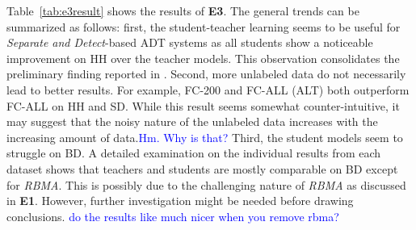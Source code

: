 \documentclass{article}
\newcommand{\comment}[1]{{\textcolor{blue}{#1}}}
\begin{document}
Table~\ref{tab:e3result} shows the results of \textbf{E3}. The general trends can be summarized as follows: first, the student-teacher learning seems to be useful for \textit{Separate and Detect}-based ADT systems as all students show a noticeable improvement on HH over the teacher models. This observation consolidates the preliminary finding reported in \cite{Wu2017}. Second, more unlabeled data do not necessarily lead to better results. For example, FC-200 and FC-ALL (ALT) both outperform FC-ALL on HH and SD. While this result seems somewhat counter-intuitive, it may suggest that the noisy nature of the unlabeled data increases with the increasing amount of data.\comment{Hm. Why is that?} Third, the student models seem to struggle on BD. A detailed examination on the individual results from each dataset shows that teachers and students are mostly comparable on BD except for \textit{RBMA}. This is possibly due to the challenging nature of \textit{RBMA} as discussed in \textbf{E1}. However, further investigation might be needed before drawing conclusions. \comment{do the results like much nicer when you remove rbma?}
\end{document}

